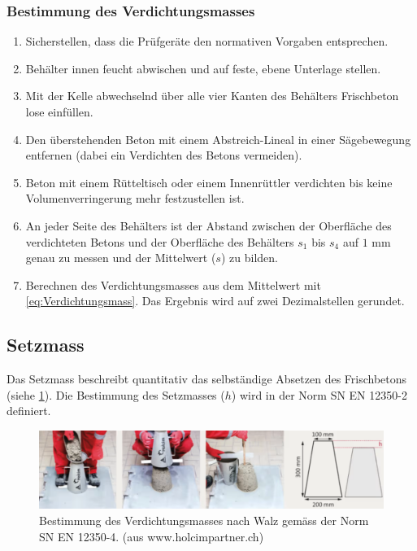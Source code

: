 \subsubsection*{Bestimmung des Verdichtungsmasses}

\begin{enumerate}
    \item Sicherstellen, dass die Prüfgeräte den normativen Vorgaben entsprechen.
    \item Behälter innen feucht abwischen und auf feste, ebene Unterlage stellen.
    \item Mit der Kelle abwechselnd über alle vier Kanten des Behälters Frischbeton lose einfüllen.
    \item Den überstehenden Beton mit einem Abstreich-Lineal in einer Sägebewegung entfernen (dabei ein Verdichten des Betons vermeiden).
    \item Beton mit einem Rütteltisch oder einem Innenrüttler verdichten bis keine Volumenverringerung mehr festzustellen ist.
    \item An jeder Seite des Behälters ist der Abstand zwischen der Oberfläche des verdichteten Betons und der Oberfläche des Behälters $s_1$ bis $s_4$ auf $1$ mm genau zu messen und der Mittelwert ($s$) zu bilden.
    \item Berechnen des Verdichtungsmasses aus dem Mittelwert mit \cref{eq:Verdichtungsmass}. Das Ergebnis wird auf zwei Dezimalstellen gerundet.
\end{enumerate}

\clearpage
\subsection*{Setzmass}
Das Setzmass beschreibt quantitativ das selbständige Absetzen des Frischbetons (siehe \cref{fig:BestimmungSetzmass}). Die Bestimmung des Setzmasses ($h$) wird in der Norm SN EN 12350-2 definiert.

\begin{figure}[h!bt]
	\centering
	\includegraphics[width=1.0\linewidth]{Bilder/Setzmass}
	\caption{Bestimmung des Verdichtungsmasses nach Walz gemäss der Norm SN EN 12350-4. (aus www.holcimpartner.ch)}
	\label{fig:BestimmungSetzmass}
\end{figure}


